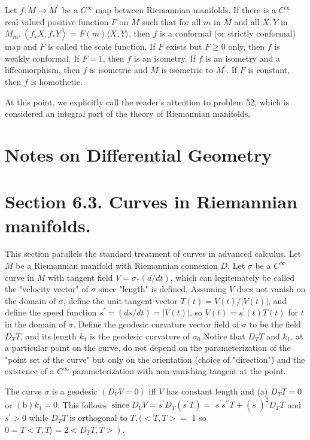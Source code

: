 \documentclass[10pt]{article}
\begin{document}
Let $f: M \rightarrow M^{\prime}$ be a $C^{\infty}$ map between Riemannian manifolds. If there is a $C^{\infty}$ real valued positive function $F$ on $M$ such that for all $m$ in $M$ and all $X, Y$ in $M_{m},\left\langle f_{\dot{*}} X, f_{*} Y\right\rangle=F(m)\langle X, Y\rangle$, then $f$ is a conformal (or strictly conformal) map and $F$ is called the scale function. If $F$ exists but $F \geq 0$ only, then $f$ is weakly conformal. If $F=1$, then $f$ is an isometry. If $f$ is an isometry and a liffeomorphism, then $f$ is isometric and $M$ is isometric to $M^{\prime}$. If $F$ is constant, then $f$ is homothetic.

At this point, we explicitly call the reader's attention to problem 52, which is considered an integral part of the theory of Riemannian manifolds.

\section{Notes on Differential Geometry}
\section{Section 6.3. Curves in Riemannian manifolds.}
This section parallels the standard treatment of curves in advanced calculus. Let $M$ be a Riemannian manifold with Riemannian connexion $D$. Let $\sigma$ be a $C^{\infty}$ curve in $M$ with tangent field $V=\sigma_{*}(d / d t)$, which can legitemately be called the "velocity vector" of $\sigma$ since "length" is defined. Assuming $V$ does not vanish on the domain of $\sigma$, define the unit tangent vector $T(t)=V(t) /|V(t)|$, and define the speed function $s^{\prime}=(d s / d t)=|V(t)|$, so $V(t)=s^{\prime}(t) T(t)$ for $t$ in the domain of $\sigma$. Define the geodesic curvature vector field of $\sigma$ to be the field $D_{T} T$, and its length $k_{1}$ is the geodesic curvature of $\sigma_{0}$ Notice that $D_{T} T$ and $k_{1}$, at a particular point on the curve, do not depend on the parameterization of the "point set of the curve" but only on the orientation (choice of "direction") and the existence of a $C^{\infty}$ parameterization with non-vanishing tangent at the point.

The curve $\sigma$ is a geodesic $\left(D_{V} V=0\right)$ iff $V$ has constant length and (a) $D_{T} T=0$ or $(\mathrm{b}) k_{1}=0$. This follows $\operatorname{since} D_{V} V=s^{\prime} D_{T}\left(s^{\prime} T\right)=$ $s^{\prime} s^{\prime \prime} T+\left(s^{\prime}\right)^{2} D_{T} T$ and $s^{\prime}>0$ while $D_{T} T$ is orthogonal to $T,(<T, T>=$ 1 so $\left.0=T<T, T\rangle=2<D_{T} T, T>\right)$.
\end{document}
